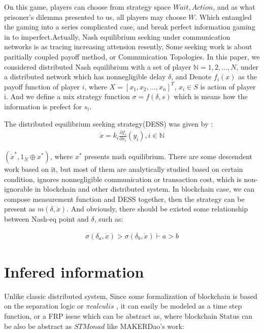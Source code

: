 \documentclass[twocolumn]{article}
\begin{document}
On this game, players can choose from strategy space ${Wait, Action}$, and as what prisoner's dilemma presented to us, all players may choose $W$. Which entangled the gaming into a series complicated case, and break perfect information gaming in to imperfect.Actually, Nash equilibrium seeking under communication networks is as tracing increasing attension resently, Some seeking work is about paritially coupled payoff method\cite{8029164}, or Communication Topologies\cite{8093754}. In this paper, we considered distributed Nash equilibrium with a set of player $\mathbb{N} = {1, 2, ..., N}$, under a distributed network which has nonnegligible delay $\mathbb{\delta}$, and Denote $f_i(x)$ as the payoff function of player $i$, where $X = [x_1, x_2, ..., x_n]^T$, $x_i \in S$ is action of player i. And we define a mix strategy function $\sigma = f(\delta, s)$ which is means how the information is prefect for $s_i$.

The distributed equilibrium seeking strategy(DESS) was given by \cite{7888532}:
\begin{gather}
  \dot{x} = k_i \frac {\partial f_i}{\partial x_i}(y_i), i \in \mathbb{N}
\end{gather}

$(\dot{x}^*, 1_N\oplus x^*)$, where $x^*$ presents nash equilibrium. There are some descendent work based on it, but most of them are analytically studied based on certain condition, ignores nonnegligible communication or transaction cost, which is non-ignorable in blockchain and other distributed system. In blockchain case, we can compose measurement function and DESS together, then the strategy can be present as $m(\delta, \dot{x})$. And obviously, there should be existed some relationship between Nash-eq point and $\delta$, such as:

\begin{gather}
  \sigma(\delta_a, \dot{x}) > \sigma(\delta_b, \dot{x}) \vdash a > b
\end{gather}

\section{Infered information}

Unlike classic distributed system,
Since some formalization of blockchain is based on the separation logic or $\pi calculis$ \cite{linearblockchain}, it can easily be modeled as a time step function, or a FRP issue which can be abstract as\cite{ElliottHudak97:Fran}, where blockchain Status can be also be abstract as $STMonad$ like MAKERDao\cite{dai}'s work:
\end{document}
